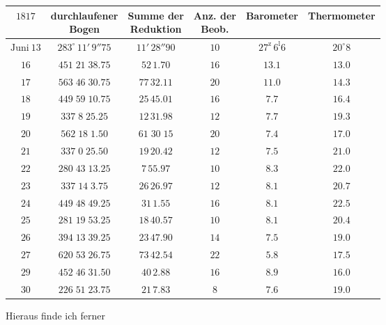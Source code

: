 \begin{center}\fontsize{9}{11}\selectfont\setlength{\tabcolsep}{3pt}\begin{tabular}{c|c|c|c|c|c}
$1817$ & \shortstack{durchlaufener\\Bogen} & \shortstack{Summe der\\Reduktion} & \shortstack{Anz. der\\Beob.} & Barometer & Thermometer\\
\hline$\text{Juni}\ 13$ & $283^\circ\,11'\,9''75$ & $11'\,28''90$ & $10$ & $27^{\mathrm z}\,6^{\mathrm l}6$ & $20^\circ8$\\
$16$ & $451\;21\;38.75$ & $52\,1.70$ & $16$ & $13.1$ & $13.0$\\
$17$ & $563\;46\;30.75$ & $77\,32.11$ & $20$ & $11.0$ & $14.3$\\
$18$ & $449\;59\;10.75$ & $25\,45.01$ & $16$ & $7.7$ & $16.4$\\
$19$ & $337\;8\;25.25$ & $12\,31.98$ & $12$ & $7.7$ & $19.3$\\
$20$ & $562\;18\;1.50$ & $61\;30\;15$ & $20$ & $7.4$ & $17.0$\\
$21$ & $337\;0\;25.50$ & $19\,20.42$ & $12$ & $7.5$ & $21.0$\\
$22$ & $280\;43\;13.25$ & $7\,55.97$ & $10$ & $8.3$ & $22.0$\\
$23$ & $337\;14\;3.75$ & $26\,26.97$ & $12$ & $8.1$ & $20.7$\\
$24$ & $449\;48\;49.25$ & $31\,1.55$ & $16$ & $8.1$ & $22.5$\\
$25$ & $281\;19\;53.25$ & $18\,40.57$ & $10$ & $8.1$ & $20.4$\\
$26$ & $394\;13\;39.25$ & $23\,47.90$ & $14$ & $7.5$ & $19.0$\\
$27$ & $620\;53\;26.75$ & $73\,42.54$ & $22$ & $5.8$ & $17.5$\\
$29$ & $452\;46\;31.50$ & $40\,2.88$ & $16$ & $8.9$ & $16.0$\\
$30$ & $226\;51\;23.75$ & $21\,7.83$ & $8$ & $7.6$ & $19.0$\\
\end{tabular}\end{center}

\par\indent Hieraus finde ich ferner

